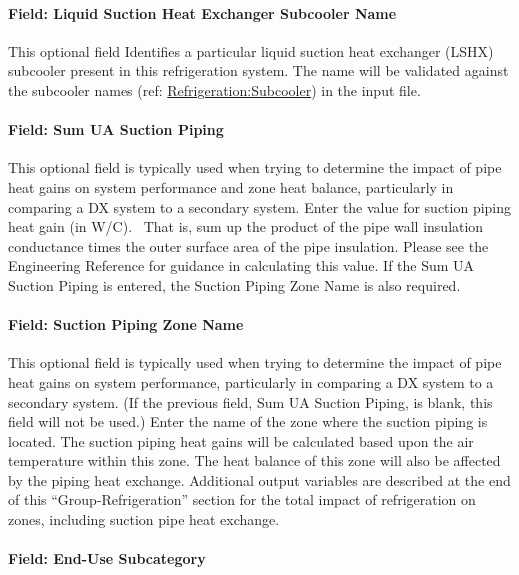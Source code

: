 \paragraph{Field: Liquid Suction Heat Exchanger Subcooler Name}\label{field-liquid-suction-heat-exchanger-subcooler-name}

This optional field Identifies a particular liquid suction heat exchanger (LSHX) subcooler present in this refrigeration system. The name will be validated against the subcooler names (ref: \hyperref[refrigerationsubcooler]{Refrigeration:Subcooler}) in the input file.

\paragraph{Field: Sum UA Suction Piping}\label{field-sum-ua-suction-piping}

This optional field is typically used when trying to determine the impact of pipe heat gains on system performance and zone heat balance, particularly in comparing a DX system to a secondary system. Enter the value for suction piping heat gain (in W/C).~ That is, sum up the product of the pipe wall insulation conductance times the outer surface area of the pipe insulation. Please see the Engineering Reference for guidance in calculating this value. If the Sum UA Suction Piping is entered, the Suction Piping Zone Name is also required.

\paragraph{Field: Suction Piping Zone Name}\label{field-suction-piping-zone-name}

This optional field is typically used when trying to determine the impact of pipe heat gains on system performance, particularly in comparing a DX system to a secondary system. (If the previous field, Sum UA Suction Piping, is blank, this field will not be used.) Enter the name of the zone where the suction piping is located. The suction piping heat gains will be calculated based upon the air temperature within this zone. The heat balance of this zone will also be affected by the piping heat exchange. Additional output variables are described at the end of this ``Group-Refrigeration'' section for the total impact of refrigeration on zones, including suction pipe heat exchange.

\paragraph{Field: End-Use Subcategory}\label{field-end-use-subcategory-1-002}

